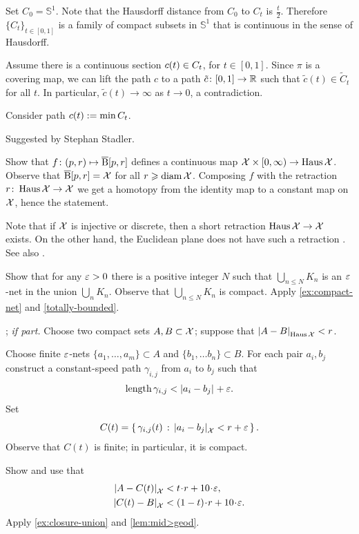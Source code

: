 Set $C_0=\mathbb{S}^1$.
Note that the Hausdorff distance from $C_0$ to $C_t$ is $\tfrac t2$.
Therefore $\{C_t\}_{t\in[0,1]}$ is a family of compact subsets in $\mathbb{S}^1$ that is continuous in the sense of Hausdorff.

Assume there is a continuous section $c(t)\z\in C_t$, for $t\in [0,1]$.
Since $\pi$ is a covering map,
we can lift the path $c$ to a path $\tilde c\colon[0,1]\to \mathbb{R}$ such that $\tilde c(t)\in \tilde C_t$ for all $t$.
In particular, $\tilde c(t)\to\infty$ as $t\to0$,
a contradiction.

Consider path $c(t)\mathrel{:=}\min C_t$.

 Suggested by Stephan Stadler.

Show that $f\colon(p,r)\mapsto \overline{\mathrm{B}}{}[p,r]$ defines a continuous map $\spc{X}\z\times[0,\infty)\to \Haus\spc{X}$.
Observe that $\overline{\mathrm{B}}{}[p,r]=\mathcal{X}$ for all $r\geqslant\operatorname{\rm diam}\nolimits\mathcal{X}$.
Composing $f$ with the retraction $r\colon\operatorname{\rm Haus}\nolimits\mathcal{X}\to \mathcal{X}$ we get a homotopy from the identity map to a constant map on $\mathcal{X}$, hence the statement.

Note that if $\mathcal{X}$ is injective or discrete, then a short retraction $\operatorname{\rm Haus}\nolimits\mathcal{X}\to \mathcal{X}$ exists.
On the other hand, the Euclidean plane does not have such a retraction \cite{petrunin-2022-MO-center, przeslawski-yost}.
See also \cite{petrunin-2022-MO-selection}.

Show that for any $\varepsilon>0$ there is a positive integer $N$ such that $\bigcup_{n\le N} K_n$ is an $\varepsilon$-net in the union $\bigcup_{n} K_n$.
Observe that $\bigcup_{n\le N} K_n$
is compact.
Apply \ref{ex:compact-net} and \ref{totally-bounded}.

\parbf{\ref{ex:Haus-length}}; \textit{if part.}
Choose two compact sets $A,B\z\subset \spc{X}$;
suppose that $\dist{A}{B}{\Haus\spc{X}}<r$.

Choose finite $\varepsilon$-nets $\{a_1,\dots,a_m\}\subset A$ and $\{b_1,\dots b_n\}\subset B$.
For each pair $a_i,b_j$ construct a constant-speed path $\gamma_{i,j}$ from $a_i$ to $b_j$ such that 
\[\length \gamma_{i,j}<\dist{a_i}{b_j}{}+\eps.\]
Set 
\[C(t)=\set{\gamma_{i,j}(t)}{\dist{a_i}{b_j}{\spc{X}}<r+\eps}.\]
Observe that $C(t)$ is finite; in particular, it is compact.

Show and use that 
\begin{align*}
\dist{A}{C(t)}{\spc{X}}&<t\cdot r+10\cdot\eps,
\\
\dist{C(t)}{B}{\spc{X}}&<(1-t)\cdot r+10\cdot\eps.
\end{align*}
Apply \ref{ex:closure-union} and \ref{lem:mid>geod}.

